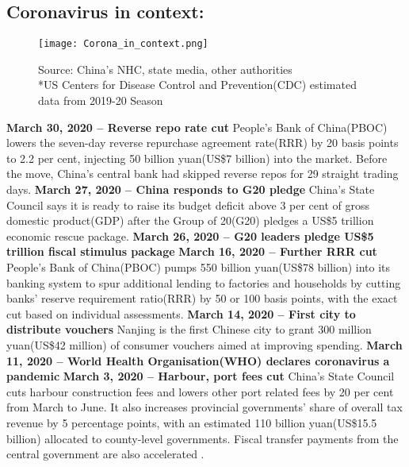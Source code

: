 \documentclass[11pt, a4paper]{article}
\begin{document}
        \subsection{Coronavirus in context:}
            \begin{figure}[H]
                \texttt{[image: Corona\_in\_context.png]}
                \caption*{
                    Source: China's NHC, state media, other authorities\\
                    *US Centers for Disease Control and Prevention(CDC) estimated data from 2019-20 Season}
            \end{figure}
            \bigbreak

            \textbf{March 30, 2020 – Reverse repo rate cut}
            \bigbreak
            People’s Bank of China(PBOC) lowers the seven-day reverse repurchase agreement rate(RRR) by 20 basis points to 2.2 per cent, injecting 50 billion yuan(US\$7 billion) into the market. Before the move, China’s central bank had skipped reverse repos for 29 straight trading days.
            \bigbreak
            \noindent
            \textbf{March 27, 2020 – China responds to G20 pledge}
            \bigbreak
            China’s State Council says it is ready to raise its budget deficit above 3 per cent of gross domestic product(GDP) after the Group of 20(G20) pledges a US\$5 trillion economic rescue package.
            \bigbreak
            \noindent
            \textbf{\Large March 26, 2020 – G20 leaders pledge US\$5 trillion fiscal stimulus package}
            \bigbreak
            \noindent
            \textbf{March 16, 2020 – Further RRR cut}
            \bigbreak
            People’s Bank of China(PBOC) pumps 550 billion yuan(US\$78 billion) into its banking system to spur additional lending to factories and households by cutting banks' reserve requirement ratio(RRR) by 50 or 100 basis points, with the exact cut based on individual assessments.
            \bigbreak
            \noindent
            \textbf{March 14, 2020 – First city to distribute vouchers}
            \bigbreak
            Nanjing is the first Chinese city to grant 300 million yuan(US\$42 million) of consumer vouchers aimed at improving spending.
            \bigbreak
            \noindent
            \textbf{\Large March 11, 2020 – World Health Organisation(WHO) declares coronavirus a pandemic}
            \bigbreak
            \noindent
            \textbf{March 3, 2020 – Harbour, port fees cut}
            \bigbreak
            China’s State Council cuts harbour construction fees and lowers other port related fees by 20 per cent from March to June. It also increases provincial governments' share of overall tax revenue by 5 percentage points, with an estimated 110 billion yuan(US\$15.5 billion) allocated to county-level governments. Fiscal transfer payments from the central government are also accelerated .
\end{document}
